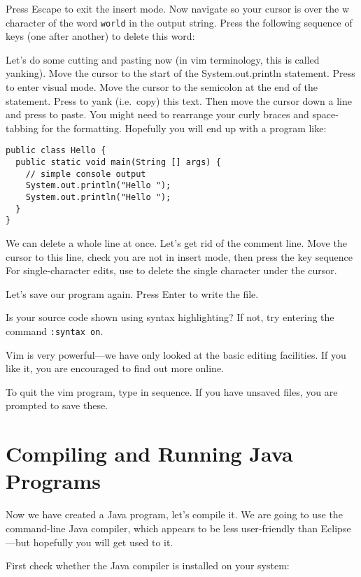 \documentclass{article}
\begin{document}
Press Escape to exit the insert mode. Now navigate so your cursor is over the w character of the word \texttt{world} in the output string. Press the following sequence of keys (one after another) to delete this word:  

Let's do some cutting and pasting now (in vim terminology, this is called yanking).
Move the cursor to the start of the System.out.println statement. Press  to enter visual mode. Move the cursor to the semicolon at the end of the statement. Press  to yank (i.e.\ copy) this text.
Then move the cursor down a line and press  to paste. You might need to rearrange your curly braces and space-tabbing for the formatting. Hopefully you will end up with a program like:
\begin{lstlisting}[style=JavaProg]
public class Hello {
  public static void main(String [] args) {
    // simple console output
    System.out.println("Hello ");
    System.out.println("Hello ");
  }
}
\end{lstlisting}

We can delete a whole line at once. Let's get rid of the comment line. Move the cursor to this line, check you are not in insert mode, then press the key sequence  
For single-character edits, use  to delete the single character under the cursor.

Let's save our program again. Press \keys{\esc} \keys{:}  Enter to write the file.

Is your source code shown using syntax highlighting? If not, try entering the command \texttt{:syntax on}.

Vim is very powerful---we have only looked at the basic editing facilities. If you like it, you are encouraged to find out more online.

To quit the vim program, type \keys{\esc} \keys{:}  \keys{\enter} in sequence.
If you have unsaved files, you are prompted to save these. 

\section*{Compiling and Running Java Programs}

Now we have created a Java program, let's compile it. We are going to use the command-line Java compiler, which appears to be less user-friendly than Eclipse---but hopefully you will get used to it.

First check whether the Java compiler is installed on your system:
\end{document}
